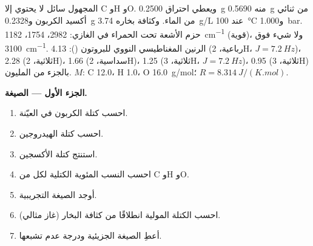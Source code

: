 \begin{problem}
\label{pb:b1:structure-spectroscopy:1}
المجهول سائل لا يحتوي إلا C وH وO. ويعطي احتراق
\qty{0.2500}{g} منه \qty{0.5690}{g} من ثنائي أكسيد الكربون
و\qty{0.2328}{g} من الماء. وكثافة بخاره \qty{3.74}{g/L} عند
\qty{100}{\celsius} و\qty{1.000}{bar}. حزم الأشعة تحت الحمراء في  الغازي: 2982،
1754، \qty{1182}{cm^{-1}} (قوية)، ولا شيء فوق
\qty{3100}{cm^{-1}}. الرنين المغناطيسي النووي للبروتون (): 4.13 (رباعية، 2H، $J = \qty{7.2}{Hz}$)،
2.28 (ثلاثية، 2H)، 1.66 (سداسية، 2H)، 1.25 (ثلاثية، 3H، $J = \qty{7.2}{Hz}$)، 0.95
(ثلاثية، 3H) بالجزء من المليون. $M$: C 12.0، H 1.0، O \qty{16.0}{g/mol}؛ $R =
\qty{8.314}{J/(K.mol)}$.

\begin{center}
\end{center}

\medskip
\noindent\textbf{الجزء الأول --- الصيغة.}
\begin{enumerate}
  \item احسب كتلة الكربون في العيّنة.
  \item احسب كتلة الهيدروجين.
  \item استنتج كتلة الأكسجين.
  \item احسب النسب المئوية الكتلية لكل من C وH وO.
  \item أوجد الصيغة التجريبية.
  \item احسب الكتلة المولية انطلاقًا من كثافة البخار (غاز مثالي).
  \item أعطِ الصيغة الجزيئية ودرجة عدم تشبعها.
\end{enumerate}


\end{problem}
